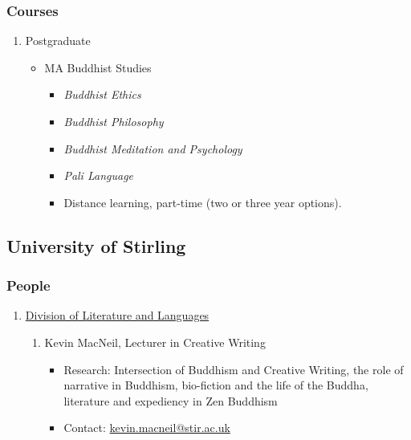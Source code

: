 \documentclass[a4paper,10.5pt]{article}
\begin{document}
\subsubsection{Courses}
\label{sec:orgf9407c4}
\begin{enumerate}
\item Postgraduate
\label{sec:orgd6e3ec1}
\begin{itemize}
\item MA Buddhist Studies\\
\begin{itemize}
\item \emph{Buddhist Ethics}\\
\item \emph{Buddhist Philosophy}\\
\item \emph{Buddhist Meditation and Psychology}\\
\item \emph{Pali Language}\\
\item Distance learning, part-time (two or three year options).\\
\end{itemize}
\end{itemize}
\end{enumerate}
\subsection{University of Stirling}
\label{sec:org1b9cf21}
\subsubsection{People}
\label{sec:orgfe54db5}
\begin{enumerate}
\item \href{https://www.stir.ac.uk/about/faculties/arts-humanities/literature-and-languages/}{Division of Literature and Languages}
\label{sec:org3a85e16}
\begin{enumerate}
\item Kevin MacNeil, Lecturer in Creative Writing
\label{sec:org0c098e5}
\begin{itemize}
\item Research: Intersection of Buddhism and Creative Writing, the role of narrative in Buddhism, bio-fiction and the life of the Buddha, literature and expediency in Zen Buddhism\\
\item Contact: \href{mailto:kevin.macneil@stir.ac.uk}{kevin.macneil@stir.ac.uk}\\
\end{itemize}
\end{enumerate}
\end{enumerate}
\end{document}

